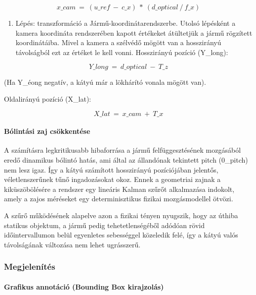 \[x\_ cam\  = \ (u\_ ref\  - \ c\_ x)\ *\ (d\_ optical\ /\ f\_ x)\]

\begin{enumerate}
\def\labelenumi{\arabic{enumi}.}
\setcounter{enumi}{4}
\item
  Lépés: transzformáció a Jármű-koordinátarendszerbe. Utolsó lépésként a
  kamera koordináta rendszerében kapott értékeket átültetjük a jármű
  rögzített koordinátáiba. Mivel a kamera a szélvédő mögött van a
  hosszirányú távolságból ezt az értéket le kell vonni. Hosszirányú
  pozíció (Y\_long):
\end{enumerate}

\[Y\_ long\  = \ d\_ optical\  - \ T\_ z\]

(Ha Y\_éong negatív, a kátyú már a lökhárító vonala mögött van).

Oldalirányú pozíció (X\_lat):

\[X\_ lat\  = \ x\_ cam\  + \ T\_ x\]

\paragraph{Bólintási zaj
csökkentése}\label{buxf3lintuxe1si-zaj-csuxf6kkentuxe9se}

A számításra legkritikusabb hibaforrása a jármű felfüggesztésének
mozgásából eredő dinamikus bólintó hatás, ami által az állandónak
tekintett pitch (0\_pitch) nem lesz igaz. Így a kátyú számított
hosszirányú pozíciójában jelentős, véletlenszerűnek tűnő ingadozásokat
okoz. Ennek a geometriai zajnak a kiküszöbölésére a rendszer egy
lineáris Kalman szűrőt alkalmazása indokolt, amely a zajos méréseket egy
determinisztikus fizikai mozgásmodellel ötvözi.

A szűrő működésének alapelve azon a fizikai tényen nyugszik, hogy az
úthiba statikus objektum, a jármű pedig tehetetlenségéből adódóan rövid
időintervallumon belül egyenletes sebességgel közeledik felé, így a
kátyú valós távolságának változása nem lehet ugrásszerű.

\subsubsection{Megjelenítés}\label{megjelenuxedtuxe9s}

\paragraph{Grafikus annotáció (Bounding Box
kirajzolás)}\label{grafikus-annotuxe1ciuxf3-bounding-box-kirajzoluxe1s}

